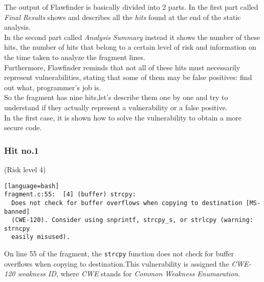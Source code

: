 \documentclass[a4paper,12pt]{article}
\begin{document}
The output of Flawfinder is basically divided into 2 parts.
In the first part called \textit{Final Results} shows and describes all the \textit{hits} found at the end of the static analysis.\\
In the second part called \textit{Analysis Summary} instead it shows the number of these hits, the number of hits that belong to a certain level of risk and information on the time taken to analyze the fragment lines.\\
Furthermore, Flawfinder reminds that not all of these hits must necessarily represent vulnerabilities, stating that some of them may be false positives: find out what, programmer's job is.\\
So the fragment has nine hits,let's describe them one by one and try to understand if they actually represent a vulnerability or a false positive.\\
In the first case, it is shown how to solve the vulnerability to obtain a more secure code.\\
\newpage
\subsubsection{Hit no.1}
(Risk level 4)
\begin{lstlisting}[style=DOS][language=bash]
fragment.c:55:  [4] (buffer) strcpy:
  Does not check for buffer overflows when copying to destination [MS-banned]
  (CWE-120). Consider using snprintf, strcpy_s, or strlcpy (warning: strncpy
  easily misused).
\end{lstlisting}
On line 55 of the fragment, the \texttt{strcpy} function does not check for buffer overflows when copying to destination.This vulnerability is assigned the \textit{CWE-120 weakness ID}, where \textit{CWE} stands for \textit{Common Weakness Enumaration}\cite{CWE}.\\
\noindent
\end{document}
